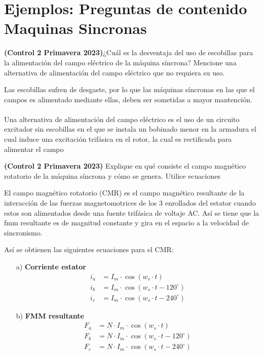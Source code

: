 \documentclass[
  11pt,
  letterpaper,
   addpoints,
   answers
  ]{exam}
\begin{document}
\section*{Ejemplos: Preguntas de contenido Maquinas Sincronas}
\begin{questions}
  \question \textbf{(Control 2 Primavera 2023)}¿Cuál es la desventaja del uso de escobillas para la alimentación del campo eléctrico de la máquina
  síncrona? Mencione una alternativa de alimentación del campo eléctrico que no requiera su uso.
  \begin{solution}
    Las escobillas sufren de desgaste, por lo que las máquinas síncronas en las que el campos es alimentado mediante ellas, deben ser sometidas a mayor mantención.\\\\
    Una alternativa de alimentación del campo eléctrico es el uso de un circuito excitador sin escobillas en el que se instala un bobinado menor en la armadura el cual induce una excitación trifásica en el rotor, la cual es rectificada para alimentar el campo
  \end{solution}
  \question \textbf{(Control 2 Primavera 2023)} Explique en qué consiste el campo magnético rotatorio de la máquina síncrona y cómo se genera. Utilice ecuaciones
  \begin{solution}
    El campo magnético rotatorio (CMR) es el campo magnético resultante de la interacción de las fuerzas magnetomotrices de los 3 enrollados del estator cuando estos son alimentados desde una fuente trifásica de voltaje AC. Así se tiene que la fmm resultante es de magnitud constante y gira en el espacio a la velocidad de sincronismo.

Así se obtienen las siguientes ecuaciones para el CMR:

\begin{itemize}
    \item[a)] \textbf{Corriente estator}
    \begin{align*}
        i_a &= I_m \cdot \cos(w_s \cdot t) \\
        i_b &= I_m \cdot \cos(w_s \cdot t - 120^\circ) \\
        i_c &= I_m \cdot \cos(w_s \cdot t - 240^\circ)
    \end{align*}

    \item[b)] \textbf{FMM resultante}
    \begin{align*}
        F_a &= N \cdot I_m \cdot \cos(w_s \cdot t) \\
        F_b &= N \cdot I_m \cdot \cos(w_s \cdot t - 120^\circ) \\
        F_c &= N \cdot I_m \cdot \cos(w_s \cdot t - 240^\circ)
    \end{align*}


\end{itemize}
\end{solution}
\end{questions}
\end{document}
